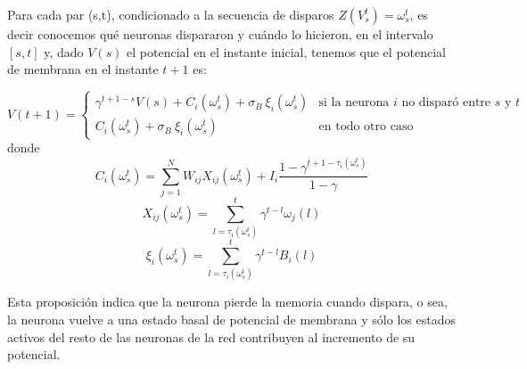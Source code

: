 \begin{prop}
\label{prop:modeloreducido}
Para cada par (s,t), condicionado a la secuencia de disparos  $Z(V_s^t)=\omega_s^t$, es decir conocemos qué neuronas dispararon y cuándo lo hicieron, en el intervalo $[s,t]$ y, dado $V(s)$ el potencial en el instante inicial, tenemos que el potencial de membrana en el instante $t+1$ es:

\begin{equation}
    V(t+1) = \left\{ \begin{array}{ll}
        \gamma^{t+1-s} V(s) + C_i(\omega_s^t) + \sigma_B \  \xi_i(\omega_s^t)   & \text{si la neurona } i \text{ no disparó entre } s \text{ y } t\\ 
        C_i(\omega_s^t) + \sigma_B \ \xi_i(\omega_s^t)  & \text{en todo otro caso}
    \end{array}\right.
    \label{eqn:potencialDef}
\end{equation}
donde
\begin{equation}
     C_i(\omega_s^t) = \sum_{j=1}^N W_{ij} X_{ij}(\omega_s^t) + I_i \frac{1-\gamma^{t+1-\tau_i(\omega_s^t) }}{1-\gamma}
\end{equation}
\begin{equation}
    X_{ij}(\omega_s^t) = \sum_{l=\tau_i(\omega_s^t)}^t \gamma^{t-l} \omega_j(l)
    \label{eqn:Xij1}
\end{equation}
\begin{equation}
    \xi_i(\omega_s^t) = \sum_{l=\tau_i(\omega_s^t)}^t \gamma^{t-l} B_i(l)
\end{equation}
\end{prop}

Esta proposición indica que la neurona pierde la memoria cuando dispara, o sea, la neurona vuelve a una estado basal de potencial de membrana y sólo los estados activos del resto de las neuronas de la red contribuyen al incremento de su potencial. 

